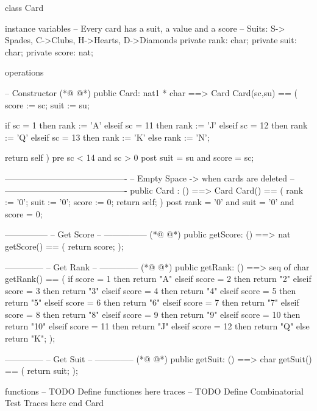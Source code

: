 \begin{vdmpp}[breaklines=true]
class Card

 instance variables
  -- Every card has a suit, a value and a score
  -- Suits: S-> Spades, C->Clubs, H->Hearts, D->Diamonds
  private rank: char;
  private suit: char;
  private score: nat; 
  
 operations
 
  -- Constructor
(*@
\label{Card:13}
@*)
  public Card: nat1 * char ==> Card
  Card(sc,su) ==
  (
   score := sc;
   suit := su;
  
   if sc = 1 then rank := 'A'
   elseif sc = 11 then rank := 'J'
   elseif sc = 12 then rank := 'Q'
   elseif sc = 13 then rank := 'K'
   else rank := 'N';
   
   return self
  )
  pre sc < 14 and sc > 0
  post suit = su and score = sc;
  
  -------------------------------------------
  -- Empty Space -> when cards are deleted --
  ------------------------------------------- 
  public Card : () ==> Card
  Card() ==
  (
   rank := '0';
   suit := '0';
   score := 0;
   return self;
  )
  post rank = '0' and suit = '0' and score = 0;
  
   
  ---------------
  -- Get Score --
  ---------------
(*@
\label{getScore:47}
@*)
  public getScore: () ==> nat
  getScore() ==
  (
   return score;
  );
  
  
  --------------
  -- Get Rank --
  --------------
(*@
\label{getRank:57}
@*)
  public getRank: () ==> seq of char
  getRank() ==
  (
   if score = 1 then return "A"
   elseif score = 2 then return "2"
   elseif score = 3 then return "3"
   elseif score = 4 then return "4"
   elseif score = 5 then return "5"
   elseif score = 6 then return "6"
   elseif score = 7 then return "7"
   elseif score = 8 then return "8"
   elseif score = 9 then return "9"
   elseif score = 10 then return "10"
   elseif score = 11  then return "J"
   elseif score = 12  then return "Q"
   else return "K";
  );
  
  
  --------------
  -- Get Suit --
  --------------
(*@
\label{getSuit:79}
@*)
  public getSuit: () ==> char
  getSuit() ==
  (
   return suit;
  );
  
  
 functions
 -- TODO Define functiones here
 traces
 -- TODO Define Combinatorial Test Traces here
end Card
\end{vdmpp}
